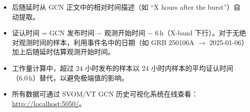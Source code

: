 \documentclass[11pt,a4paper]{article}
\begin{document}

\begin{itemize}
\item 后随延时从 GCN 正文中的相对时间描述（如 ``X hours after the burst''）自动提取。
\item 证认时间 = GCN 发布时间 $-$ 观测开始时间 $-$ 6\,h（X-band 下行）。对于无绝对观测时间的样本，利用事件名中的日期（如 GRB 250106A $\rightarrow$ 2025-01-06）加上后随延时估算观测开始时间。
\item 工作量计算中，超过 24 小时发布的样本以 24 小时内样本的平均证认时间（6.0\,h）替代，以避免极端值的影响。
\item 所有数据可通过 SVOM/VT GCN 历史可视化系统在线查看：\url{http://localhost:5050/}。
\end{itemize}
\end{document}
